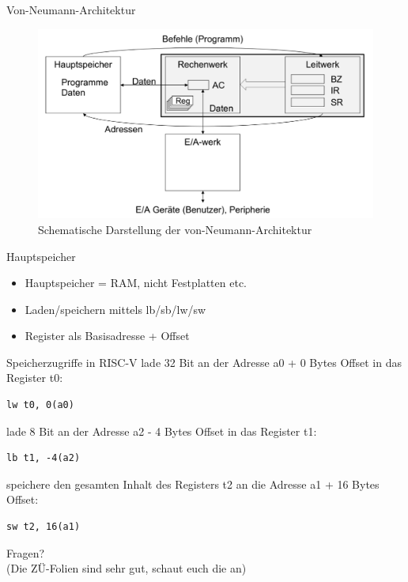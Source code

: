 \documentclass[
  german,            %
  aspectratio=169,    %
]{tumbeamer}
\begin{document}
\begin{frame}[c]{Von-Neumann-Architektur}{}
  \begin{figure}[h]
    \includegraphics[height=0.75\textheight]{resources/w03_von_Neumann.png}
    \caption{Schematische Darstellung der von-Neumann-Architektur}
  \end{figure}
\end{frame}

\begin{frame}[fragile, c]{Hauptspeicher}{}
  \begin{itemize}
    \item Hauptspeicher = RAM, nicht Festplatten etc. 
    \item Laden/speichern mittels lb/sb/lw/sw
    \item Register als Basisadresse + Offset
  \end{itemize}  
\end{frame}

\begin{frame}[fragile, c]{Speicherzugriffe in RISC-V}{}
  lade 32 Bit an der Adresse a0 + 0 Bytes Offset in das Register t0: 
  \begin{verbatim}lw t0, 0(a0)\end{verbatim}
  lade 8 Bit an der Adresse a2 - 4 Bytes Offset in das Register t1: 
  \begin{verbatim}lb t1, -4(a2)\end{verbatim}
  speichere den gesamten Inhalt des Registers t2 an die Adresse a1 + 16 Bytes Offset:
  \begin{verbatim}sw t2, 16(a1)\end{verbatim}
\end{frame}

\begin{frame}[c]{}{}
  \begin{center}
    \LARGE Fragen?\\
    \Large (Die ZÜ-Folien sind sehr gut, schaut euch die an)
  \end{center}
\end{frame}
\end{document}
